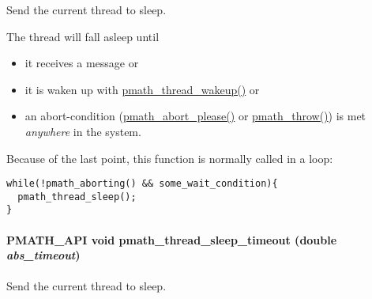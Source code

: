 Send the current thread to sleep. 

The thread will fall asleep until\begin{itemize}
\item it receives a message or\item it is waken up with \hyperlink{group__threadmsg_gbf90d49f5c42ccaa736ae5e56af6a4a6}{pmath\_\-thread\_\-wakeup()} or\item an abort-condition (\hyperlink{group__threads_g84e45036b76764def6390af12d2070bf}{pmath\_\-abort\_\-please()} or \hyperlink{group__threads_gf1aa6d6603faaa4120207be6108e356c}{pmath\_\-throw()}) is met {\em anywhere\/} in the system.\end{itemize}


Because of the last point, this function is normally called in a loop: 

\begin{Code}\begin{verbatim}while(!pmath_aborting() && some_wait_condition){
  pmath_thread_sleep();
}
\end{verbatim}
\end{Code}

 \hypertarget{group__threadmsg_g199f3dc07d4b89174e641fa4b0b757db}{
\paragraph[{pmath\_\-thread\_\-sleep\_\-timeout}]{\setlength{\rightskip}{0pt plus 5cm}PMATH\_\-API void pmath\_\-thread\_\-sleep\_\-timeout (double {\em abs\_\-timeout})}\hfill}
\label{group__threadmsg_g199f3dc07d4b89174e641fa4b0b757db}


Send the current thread to sleep. 


